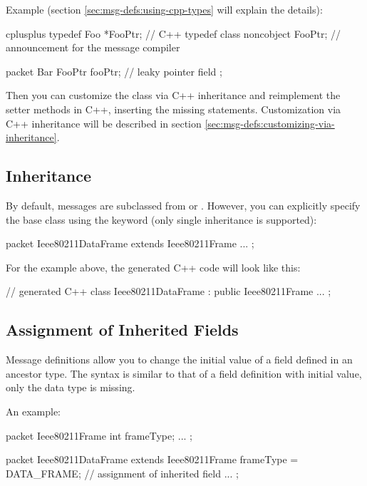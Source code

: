 Example (section \ref{sec:msg-defs:using-cpp-types} will explain the
details):

\begin{msg}
cplusplus {{ typedef Foo *FooPtr; }} // C++ typedef
class noncobject FooPtr; // announcement for the message compiler

packet Bar
{
    FooPtr fooPtr;  // leaky pointer field
};
\end{msg}

Then you can customize the class via C++ inheritance and reimplement
the setter methods in C++, inserting the missing  statements.
Customization via C++ inheritance will be described in section
\ref{sec:msg-defs:customizing-via-inheritance}.


\subsection{Inheritance}
\label{sec:msg-defs:inheritance}

By default, messages are subclassed from  or
. However, you can explicitly specify the base class using
the  keyword (only single inheritance is supported):

\begin{msg}
packet Ieee80211DataFrame extends Ieee80211Frame
{
    ...
};
\end{msg}

For the example above, the generated C++ code will look like this:

\begin{cpp}
// generated C++
class Ieee80211DataFrame : public Ieee80211Frame {
    ...
};
\end{cpp}


\subsection{Assignment of Inherited Fields}
\label{sec:msg-defs:assignment-of-inherited-fields}

Message definitions allow you to change the initial value of a field
defined in an ancestor type. The syntax is similar to that of a field
definition with initial value, only the data type is missing.

An example:

\begin{msg}
packet Ieee80211Frame
{
    int frameType;
    ...
};

packet Ieee80211DataFrame extends Ieee80211Frame
{
    frameType = DATA_FRAME;  // assignment of inherited field
    ...
};
\end{msg}

